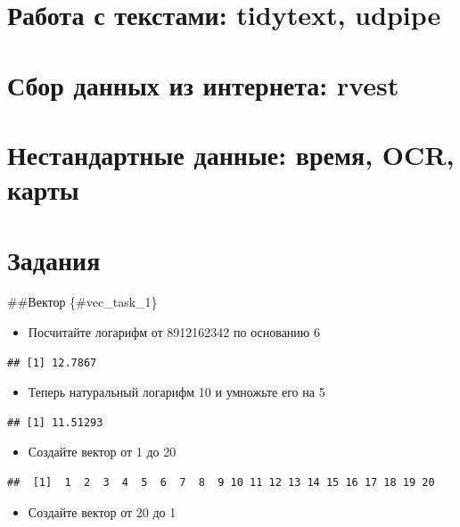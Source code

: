 \documentclass[]{book}
\providecommand{\tightlist}{%
  \setlength{\itemsep}{0pt}\setlength{\parskip}{0pt}}
\begin{document}
\hypertarget{tidytext}{%
\chapter{Работа с текстами: tidytext, udpipe}\label{tidytext}}

\hypertarget{rvest}{%
\chapter{Сбор данных из интернета: rvest}\label{rvest}}

\hypertarget{non_standard_data}{%
\chapter{Нестандартные данные: время, OCR, карты}\label{non_standard_data}}

\hypertarget{tasks}{%
\chapter{Задания}\label{tasks}}

\#\#Вектор \{\#vec\_task\_1\}

\begin{itemize}
\tightlist
\item
  Посчитайте логарифм от 8912162342 по основанию 6
\end{itemize}

\begin{verbatim}
## [1] 12.7867
\end{verbatim}

\begin{itemize}
\tightlist
\item
  Теперь натуральный логарифм 10 и умножьте его на 5
\end{itemize}

\begin{verbatim}
## [1] 11.51293
\end{verbatim}

\begin{itemize}
\tightlist
\item
  Создайте вектор от 1 до 20
\end{itemize}

\begin{verbatim}
##  [1]  1  2  3  4  5  6  7  8  9 10 11 12 13 14 15 16 17 18 19 20
\end{verbatim}

\begin{itemize}
\tightlist
\item
  Создайте вектор от 20 до 1
\end{itemize}
\end{document}

